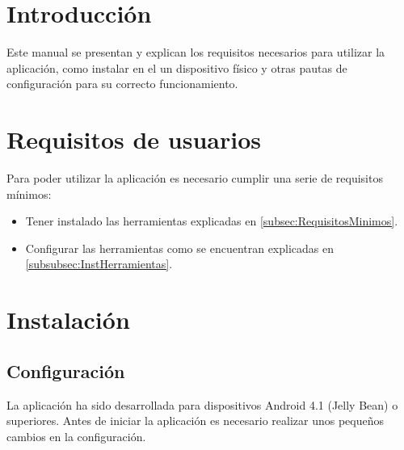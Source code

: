 
\section{Introducción}

Este manual se presentan y explican los requisitos necesarios para utilizar la aplicación, como instalar en el un dispositivo físico y otras pautas de configuración para su correcto funcionamiento.

\section{Requisitos de usuarios}

Para poder utilizar la aplicación es necesario cumplir una serie de requisitos mínimos:

\begin{itemize}

	\item Tener instalado  las herramientas explicadas en \ref{subsec:RequisitosMinimos}.
	\item Configurar las herramientas como se encuentran explicadas en \ref{subsubsec:InstHerramientas}.

\end{itemize}

\section{Instalación}

\subsection{Configuración}\label{subsec:ConfiguracionMaquina}

La aplicación ha sido desarrollada para dispositivos Android 4.1 (Jelly Bean) o superiores. Antes de iniciar la aplicación es necesario realizar unos pequeños cambios en la configuración.

